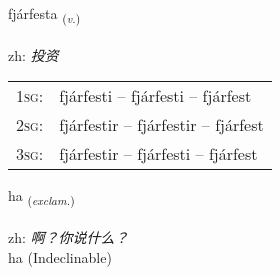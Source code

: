 \documentclass[frontgrid, backgrid]{flacards}\usepackage[]{graphicx}\usepackage[]{color}
\begin{document}
\renewcommand{\flhead}{\vskip5pt \fboxsep=0pt {\small\bfseries\footnotesize Sagnorð | 动词}}
\renewcommand{\fcfoot}{\vskip5pt \fboxsep=0pt \hspace{2pt}{\small\bfseries\footnotesize 2K}}

\renewcommand{\blhead}{\vskip5pt {\small\bfseries\footnotesize Sagnorð | 动词 }}
\renewcommand{\bcfoot}{\vskip5pt \hspace{2pt}{\small\bfseries\footnotesize 2K}}


{fjárfesta \small{\textsubscript{(\textit{v.})}} \\[1ex] %
 \\
zh: \emph{投资} \\  [2ex]
\renewcommand*{\arraystretch}{0.8}
\begin{tabular}{p{1cm}l}
\textsc{1sg}: & fjárfesti -- fjárfesti -- fjárfest \\ 
\textsc{2sg}: & fjárfestir -- fjárfestir -- fjárfest \\ 
\textsc{3sg}: & fjárfestir -- fjárfesti -- fjárfest \\ 
\end{tabular}
}


\renewcommand{\flhead}{\vskip5pt \fboxsep=0pt {\small\bfseries\footnotesize Upphrópanir | 感叹词}}
\renewcommand{\fcfoot}{\vskip5pt \fboxsep=0pt \hspace{2pt}{\small\bfseries\footnotesize 2K}}

\renewcommand{\blhead}{\vskip5pt {\small\bfseries\footnotesize Upphrópanir | 感叹词 }}
\renewcommand{\bcfoot}{\vskip5pt \hspace{2pt}{\small\bfseries\footnotesize 2K}}


{ha \small{\textsubscript{(\textit{exclam.})}} \\[1ex]
\textphonetic{[haː]} \\
zh: \emph{啊？你说什么？} \\  [2ex]
ha (Indeclinable)}
\end{document}
